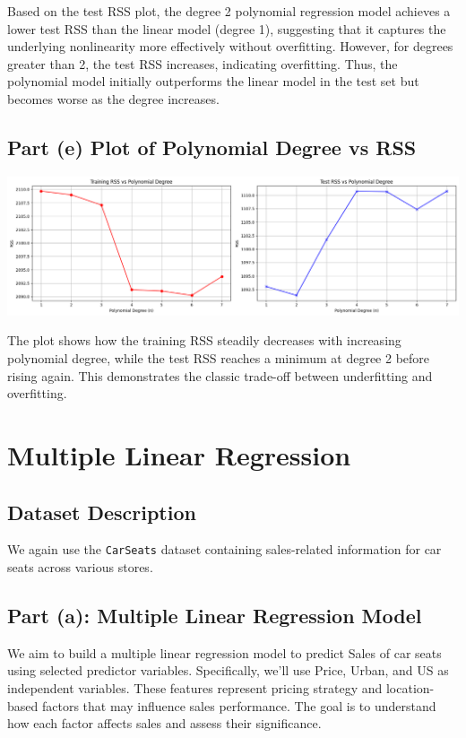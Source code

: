 \documentclass[12pt]{article}
\begin{document}
Based on the test RSS plot, the degree 2 polynomial regression model achieves a lower test RSS than the linear model (degree 1), suggesting that it captures the underlying nonlinearity more effectively without overfitting. However, for degrees greater than 2, the test RSS increases, indicating overfitting. Thus, the polynomial model initially outperforms the linear model in the test set but becomes worse as the degree increases.

\subsection*{Part (e) Plot of Polynomial Degree vs RSS}

\begin{center}
\includegraphics[width=1.0\textwidth]{images/slr/rssVSn.png}
\end{center}

\noindent
The plot shows how the training RSS steadily decreases with increasing polynomial degree, while the test RSS reaches a minimum at degree 2 before rising again. This demonstrates the classic trade-off between underfitting and overfitting.

\newpage

\section*{Multiple Linear Regression}

\subsection*{Dataset Description}
We again use the \texttt{CarSeats} dataset containing sales-related information for car seats across various stores.

\subsection*{Part (a): Multiple Linear Regression Model}
We aim to build a multiple linear regression model to predict Sales of car seats using selected predictor variables. Specifically, we’ll use Price, Urban, and US as independent variables. These features represent pricing strategy and location-based factors that may influence sales performance. The goal is to understand how each factor affects sales and assess their significance.
\end{document}
